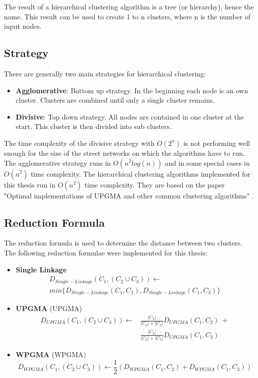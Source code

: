 The result of a hierarchical clustering algorithm is a tree (or hierarchy), hence the name. This result can be used to create 1 to n clusters, where n is the number of input nodes.

\subsection{Strategy}
There are generally two main strategies for hierarchical clustering:

\begin{itemize}
    \item \textbf{Agglomerative}: Bottom up strategy. In the beginning each node is an own cluster. Clusters are combined until only a single cluster remains.
    \item \textbf{Divisive}: Top down strategy. All nodes are contained in one cluster at the start. This cluster is then divided into sub clusters.
\end{itemize}

The time complexity of the divisive strategy with $O(2^n)$ is not performing well enough for the size of the street networks on which the algorithms have to run. The agglomerative strategy runs in $O(n^2 log(n))$ and in some special cases in $O(n^2)$ time complexity. The hierarchical clustering algorithms implemented for this thesis run in $O(n^2)$ time complexity. They are based on the paper "Optimal implementations of UPGMA and other common clustering algorithms" \cite{clustering:2007}.

\subsection{Reduction Formula}
The reduction formula is used to determine the distance between two clusters.
The following reduction formulae were implemented for this thesis:

\begin{itemize}
    \item \textbf{Single Linkage}
    \begin{multline}
    D_{Single-Linkage}(C_1, (C_2 \cup C_3)) \leftarrow \\
    min \{ D_{Single-Linkage}(C_1, C_2), D_{Single-Linkage}(C_1, C_3) \}
    \end{multline}
    \item \textbf{\acrshort{UPGMA}} (\acrlong{UPGMA})
    \begin{equation}
    \begin{split}
    D_{UPGMA}(C_1, (C_2 \cup C_3)) \leftarrow &\frac{|C_2|}{|C_2|+|C_3|}D_{UPGMA}(C_1, C_2)\ + \\ &\frac{|C_3|}{|C_2|+|C_3|}D_{UPGMA}(C_1, C_3)
    \end{split}
    \end{equation}
    \item \textbf{\acrshort{WPGMA}} (\acrlong{WPGMA})
    \begin{equation}
    D_{WPGMA}(C_1, (C_2 \cup C_3)) \leftarrow \frac{1}{2} (D_{WPGMA}(C_1, C_2) + D_{WPGMA}(C_1, C_3))
    \end{equation}
\end{itemize}

